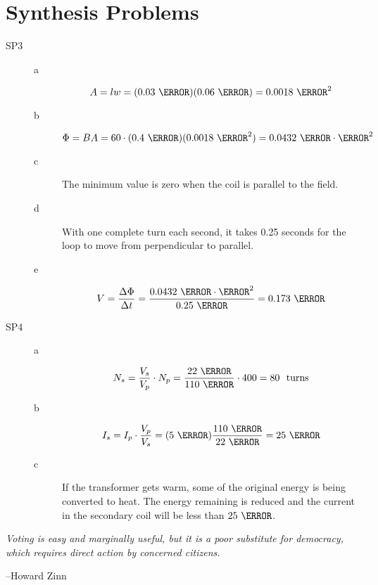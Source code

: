 \documentclass{exam}
\begin{document}
\section{Synthesis Problems}

\begin{description}
\item[SP3]
\begin{description}

\item[a]
\[
  A = lw = (0.03 \ \meter)(0.06 \ \meter) = 0.0018 \ \meter^2
\]

\item[b]
\[
  \Phi = BA =60 \cdot  (0.4 \ \tesla)(0.0018 \ \meter^2) = 0.0432 \ \tesla \cdot \meter^2
\]

\item[c]
The minimum value is zero when the coil is parallel to the field.

\item[d]
With one complete turn each second, it takes 0.25 seconds for the loop to move from perpendicular to parallel.

\item[e]
\[
  V = \frac{\Delta \Phi}{\Delta t} = \frac{0.0432 \ \tesla \cdot \meter^2}{0.25 \ \second} = 0.173 \ \volt
\]

\end{description}

\item[SP4]
\begin{description}
\item[a]
\[
  N_s = \frac{V_s}{V_p} \cdot N_p = \frac{22 \ \volt}{110 \ \volt} \cdot 400 = 80 \ \text{ turns}
\]

\item[b]
\[
  I_s = I_p \cdot \frac{V_p}{V_s} = (5 \ \ampere) \frac{110 \ \volt}{22 \ \volt} = 25 \ \ampere
\]

\item[c]
If the transformer gets warm, some of the original energy is being converted to heat.  The energy remaining is reduced
and the current in the secondary coil will be less than $25 \ \ampere$.

\end{description}

\end{description}

\else

\vspace{4.5 cm}

{\em 
Voting is easy and marginally useful, but it is a poor substitute for democracy, which requires direct action by concerned citizens.
} 

\vspace{.2 cm}

\hspace{1 cm} --Howard Zinn

\fi
\end{document}
